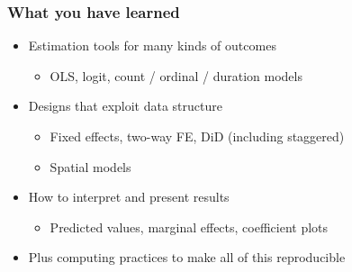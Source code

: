 \begin{frame}
\frametitle{What you have learned}
\centering

\begin{itemize}[<+->]
\item Estimation tools for many kinds of outcomes
  \begin{itemize}
  \item OLS, logit, count / ordinal / duration models
  \end{itemize}
\vspace{6pt}
\item Designs that exploit data structure
  \begin{itemize}
  \item Fixed effects, two-way FE, DiD (including staggered)
  \item Spatial models
  \end{itemize}
\vspace{6pt}
\item How to interpret and present results
  \begin{itemize}
  \item Predicted values, marginal effects, coefficient plots
  \end{itemize}
\vspace{6pt}
\item Plus computing practices to make all of this reproducible
\end{itemize}

\end{frame}

